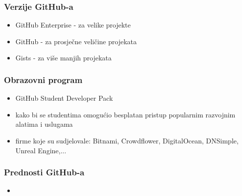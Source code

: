 \documentclass[12p, Times New Roman]{beamer}
\begin{document}
	\begin{frame}				%
		\frametitle{Verzije GitHub-a}
		\begin{itemize}
			\item GitHub Enterprise - za velike projekte
			\item GitHub - za prosječne veličine projekata
			\item Gists - za više manjih projekata

		\end{itemize}

	\end{frame}



	\begin{frame}				%
		\frametitle{Obrazovni program}
		\begin{itemize}
			\item GitHub Student Developer Pack
			\item kako bi se studentima omogućio besplatan pristup popularnim razvojnim alatima i uslugama
			\item firme koje su sudjelovale: Bitnami, Crowdflower, DigitalOcean, DNSimple, Unreal Engine,...

		\end{itemize}


	\end{frame}



	\begin{frame}				%
		\frametitle{Prednosti GitHub-a}
		\begin{itemize}
			\item 

		\end{itemize}


	\end{frame}
\end{document}
